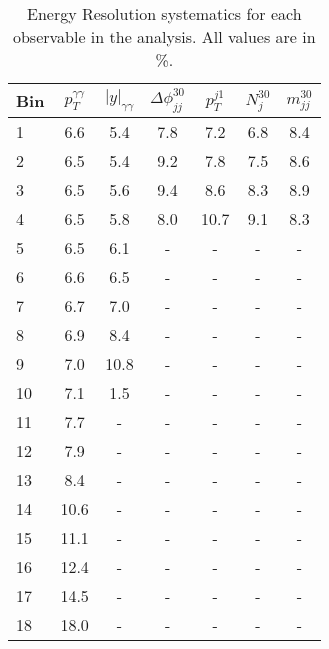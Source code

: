 \documentclass[a4paper,11pt]{article}
\begin{document}
\begin{table}[h]
\centering
\small
\caption{Energy Resolution systematics for each observable in the analysis. All values are in \%.}
\vspace{0.4cm}
\begin{tabular}{l | cccccc}
Bin & $p_T^{\gamma\gamma}$ & $|y|_{\gamma\gamma}$ & $\Delta\phi_{jj}^{30}$ & $p_T^{j1}$ & $N_j^{30}$ & $m_{jj}^{30}$ \\
\hline
1 & 6.6 & 5.4 & 7.8 & 7.2 & 6.8 & 8.4 \\
2 & 6.5 & 5.4 & 9.2 & 7.8 & 7.5 & 8.6 \\
3 & 6.5 & 5.6 & 9.4 & 8.6 & 8.3 & 8.9 \\
4 & 6.5 & 5.8 & 8.0 & 10.7 & 9.1 & 8.3 \\
5 & 6.5 & 6.1 & - & - & - & - \\
6 & 6.6 & 6.5 & - & - & - & - \\
7 & 6.7 & 7.0 & - & - & - & - \\
8 & 6.9 & 8.4 & - & - & - & - \\
9 & 7.0 & 10.8 & - & - & - & - \\
10 & 7.1 & 1.5 & - & - & - & - \\
11 & 7.7 & - & - & - & - & - \\
12 & 7.9 & - & - & - & - & - \\
13 & 8.4 & - & - & - & - & - \\
14 & 10.6 & - & - & - & - & - \\
15 & 11.1 & - & - & - & - & - \\
16 & 12.4 & - & - & - & - & - \\
17 & 14.5 & - & - & - & - & - \\
18 & 18.0 & - & - & - & - & - \\
\end{tabular}

\vspace{0.5cm}


\end{table}
\end{document}
